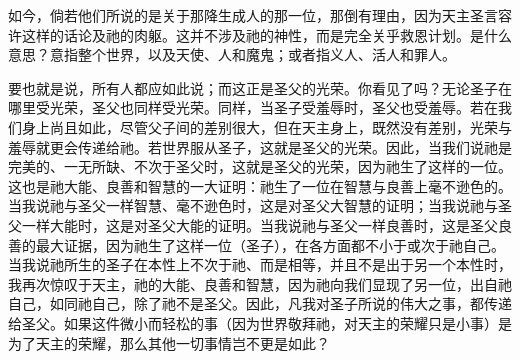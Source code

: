 如今，倘若他们所说的是关于那降生成人的那一位，那倒有理由，因为天主圣言容许这样的话论及祂的肉躯。这并不涉及祂的神性，而是完全关乎救恩计划。是什么意思？意指整个世界，以及天使、人和魔鬼；或者指义人、活人和罪人。\par

要也就是说，所有人都应如此说；而这正是圣父的光荣。你看见了吗？无论圣子在哪里受光荣，圣父也同样受光荣。同样，当圣子受羞辱时，圣父也受羞辱。若在我们身上尚且如此，尽管父子间的差别很大，但在天主身上，既然没有差别，光荣与羞辱就更会传递给祂。若世界服从圣子，这就是圣父的光荣。因此，当我们说祂是完美的、一无所缺、不次于圣父时，这就是圣父的光荣，因为祂生了这样的一位。这也是祂大能、良善和智慧的一大证明：祂生了一位在智慧与良善上毫不逊色的。当我说祂与圣父一样智慧、毫不逊色时，这是对圣父大智慧的证明；当我说祂与圣父一样大能时，这是对圣父大能的证明。当我说祂与圣父一样良善时，这是圣父良善的最大证据，因为祂生了这样一位（圣子），在各方面都不小于或次于祂自己。当我说祂所生的圣子在本性上不次于祂、而是相等，并且不是出于另一个本性时，我再次惊叹于天主，祂的大能、良善和智慧，因为祂向我们显现了另一位，出自祂自己，如同祂自己，除了祂不是圣父。因此，凡我对圣子所说的伟大之事，都传递给圣父。如果这件微小而轻松的事（因为世界敬拜祂，对天主的荣耀只是小事）是为了天主的荣耀，那么其他一切事情岂不更是如此？\par

